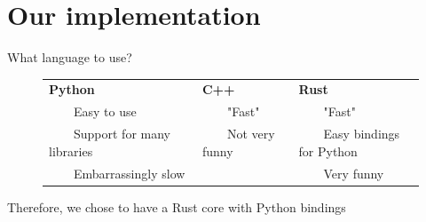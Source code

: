 \documentclass[aspectratio=169]{beamer}
\newcommand{\tabitem}{~~\llap{\textbullet}~~}
\begin{document}
\section{Our implementation}
\begin{frame}{What language to use?}
    \begin{figure}
        \centering
        \renewcommand{\arraystretch}{1.4}
        \begin{tabular}{p{5cm}p{3.5cm}p{4.5cm}}
            \centering\textbf{Python}           & \centering\textbf{C++}  & \hspace{1.6cm}\textbf{Rust}       \\
            \tabitem Easy to use                & \tabitem "Fast"           & \tabitem "Fast"                     \\
            \tabitem Support for many libraries & \tabitem Not very funny & \tabitem Easy bindings for Python \\
            \tabitem Embarrassingly slow        &                         & \tabitem Very funny
        \end{tabular}
    \end{figure}
    \vspace*{1cm}
    \centering
    Therefore, we chose to have a Rust core with Python bindings
\end{frame}
\end{document}

